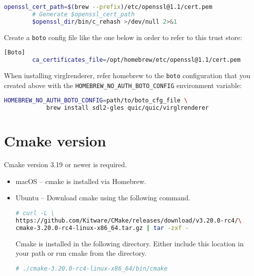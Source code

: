 \begin{enumerate}
\begin{lstlisting}[language=bash]
		openssl_cert_path=$(brew --prefix)/etc/openssl@1.1/cert.pem
		# Generate $openssl_cert_path
		$openssl_dir/bin/c_rehash >/dev/null 2>&1
	\end{lstlisting}
	\normalsize

Create a {\lstinline!boto!} config file like the one below in order to
refer to this trust store:

	\small
	\begin{lstlisting}[language=bash]
		[Boto]
		ca_certificates_file=/opt/homebrew/etc/openssl@1.1/cert.pem
	\end{lstlisting}
	\normalsize

When installing virglrenderer, refer homebrew to the {\lstinline!boto!}
configuration that you created above with the
{\lstinline!HOMEBREW_NO_AUTH_BOTO_CONFIG!} environment variable:

	\small
	\begin{lstlisting}[language=bash]
		HOMEBREW_NO_AUTH_BOTO_CONFIG=path/to/boto_cfg_file \
			brew install sdl2-gles quic/quic/virglrenderer
	\end{lstlisting}
	\normalsize


\end{enumerate}

\section{Cmake version}

Cmake version 3.19 or newer is required.

\begin{itemize}
\item macOS -- cmake is installed via Homebrew.
\item Ubuntu -- Download cmake using the following command.

\small
\begin{lstlisting}[language=bash]
    # curl -L \
https://github.com/Kitware/CMake/releases/download/v3.20.0-rc4/\
cmake-3.20.0-rc4-linux-x86_64.tar.gz | tar -zxf -
\end{lstlisting}
\normalsize

Cmake is installed in the following directory. Either include this location in your path or run cmake from the directory.

\small
\begin{lstlisting}[language=bash]
    # ./cmake-3.20.0-rc4-linux-x86_64/bin/cmake
\end{lstlisting}
\normalsize

\end{itemize}

